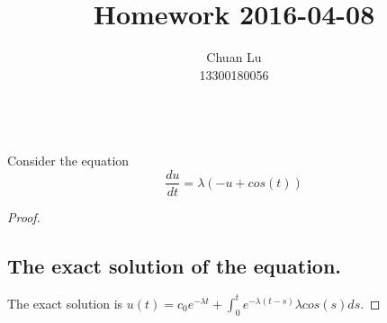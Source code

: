 \documentclass{article}
\newenvironment{problem}[2][Problem]{\begin{trivlist}
\item[\hskip \labelsep {\bfseries #1}\hskip \labelsep {\bfseries #2.}]}{\end{trivlist}}
\begin{document}
\title{Homework 2016-04-08}
\author{Chuan Lu\\
13300180056}

\maketitle

\begin{problem}{1}
\text{ }\\
Consider the equation $$\frac{du}{dt}=\lambda(-u + cos(t))$$ 
\end{problem}

\begin{proof}
\subsection{The exact solution of the equation.} 
The exact solution is $u(t) = c_{0}e^{-\lambda t}+\int_{0}^{t}e^{-\lambda(t-s)}\lambda cos(s)ds$.

\end{proof}
\end{document}
